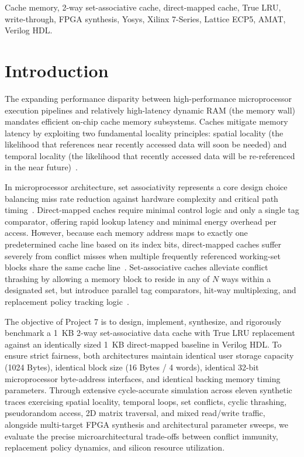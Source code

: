 \documentclass[journal,10pt,twocolumn]{IEEEtran}
\begin{document}
\begin{IEEEkeywords}
Cache memory, 2-way set-associative cache, direct-mapped cache, True LRU, write-through, FPGA synthesis, Yosys, Xilinx 7-Series, Lattice ECP5, AMAT, Verilog HDL.
\end{IEEEkeywords}

\section{Introduction}
The expanding performance disparity between high-performance microprocessor execution pipelines and relatively high-latency dynamic RAM (the memory wall) mandates efficient on-chip cache memory subsystems. Caches mitigate memory latency by exploiting two fundamental locality principles: spatial locality (the likelihood that references near recently accessed data will soon be needed) and temporal locality (the likelihood that recently accessed data will be re-referenced in the near future)~\cite{hennessy2017,smith1982cache}.

In microprocessor architecture, set associativity represents a core design choice balancing miss rate reduction against hardware complexity and critical path timing~\cite{hennessy2017,hill1989evaluating}. Direct-mapped caches require minimal control logic and only a single tag comparator, offering rapid lookup latency and minimal energy overhead per access. However, because each memory address maps to exactly one predetermined cache line based on its index bits, direct-mapped caches suffer severely from conflict misses when multiple frequently referenced working-set blocks share the same cache line~\cite{jouppi1990improving}. Set-associative caches alleviate conflict thrashing by allowing a memory block to reside in any of $N$ ways within a designated set, but introduce parallel tag comparators, hit-way multiplexing, and replacement policy tracking logic~\cite{hennessy2017,hill1989evaluating}.

The objective of Project 7 is to design, implement, synthesize, and rigorously benchmark a 1~KB 2-way set-associative data cache with True LRU replacement against an identically sized 1~KB direct-mapped baseline in Verilog HDL. To ensure strict fairness, both architectures maintain identical user storage capacity (1024 Bytes), identical block size (16 Bytes / 4 words), identical 32-bit microprocessor byte-address interfaces, and identical backing memory timing parameters. Through extensive cycle-accurate simulation across eleven synthetic traces exercising spatial locality, temporal loops, set conflicts, cyclic thrashing, pseudorandom access, 2D matrix traversal, and mixed read/write traffic, alongside multi-target FPGA synthesis and architectural parameter sweeps, we evaluate the precise microarchitectural trade-offs between conflict immunity, replacement policy dynamics, and silicon resource utilization.
\end{document}
